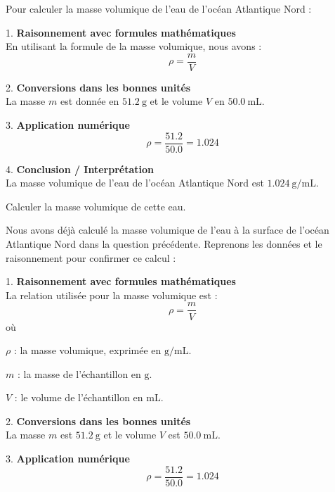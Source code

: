 \documentclass[answers]{exam}
\begin{document}
\begin{questions}
\begin{solution}
Pour calculer la masse volumique de l'eau de l'océan Atlantique Nord :

1. \textbf{Raisonnement avec formules mathématiques} \\
   En utilisant la formule de la masse volumique, nous avons :
   \[
   \rho = \frac{m}{V}
   \]

2. \textbf{Conversions dans les bonnes unités} \\
   La masse $m$ est donnée en \(\SI{51.2}{\gram}\) et le volume $V$ en \(\SI{50.0}{\milli\liter}\).

3. \textbf{Application numérique} \\
   \[
   \rho = \frac{51.2}{50.0} = 1.024
   \]

4. \textbf{Conclusion / Interprétation} \\
   La masse volumique de l'eau de l'océan Atlantique Nord est \(\SI{1.024}{\gram\per\milli\liter}\).
\end{solution}

\question[4] Calculer la masse volumique de cette eau.
  
  

\begin{solution}
Nous avons déjà calculé la masse volumique de l'eau à la surface de l'océan Atlantique Nord dans la question précédente. Reprenons les données et le raisonnement pour confirmer ce calcul :

1. \textbf{Raisonnement avec formules mathématiques} \\
   La relation utilisée pour la masse volumique est :
   \[
   \rho = \frac{m}{V}
   \]
   où
   \begin{addmargin}[4em]{1em}
   \begin{compactitem}
       \item [$\rho$]: la masse volumique, exprimée en \(\si{\gram\per\milli\liter}\).
       \item [$m$]: la masse de l'échantillon en \(\si{\gram}\).
       \item [$V$]: le volume de l'échantillon en \(\si{\milli\liter}\).
   \end{compactitem}
   \end{addmargin}

2. \textbf{Conversions dans les bonnes unités} \\
   La masse $m$ est \(\SI{51.2}{\gram}\) et le volume $V$ est \(\SI{50.0}{\milli\liter}\).

3. \textbf{Application numérique} \\
   \[
   \rho = \frac{51.2}{50.0} = 1.024
   \]
   

\end{solution}
\end{questions}
\end{document}
